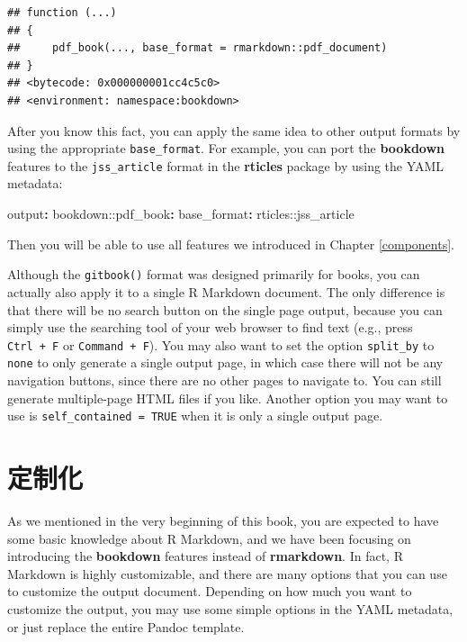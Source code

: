 \documentclass[
  12pt,
]{krantz}
\newenvironment{Shaded}{\begin{snugshade}}{\end{snugshade}}
\newcommand{\AttributeTok}[1]{\textcolor[rgb]{0.77,0.63,0.00}{#1}}
\newcommand{\FunctionTok}[1]{\textcolor[rgb]{0.00,0.00,0.00}{#1}}
\newcommand{\KeywordTok}[1]{\textcolor[rgb]{0.13,0.29,0.53}{\textbf{#1}}}
\theoremstyle{definition}
\theoremstyle{definition}
\theoremstyle{definition}
\theoremstyle{definition}
\theoremstyle{remark}
\begin{document}
\begin{verbatim}
## function (...) 
## {
##     pdf_book(..., base_format = rmarkdown::pdf_document)
## }
## <bytecode: 0x000000001cc4c5c0>
## <environment: namespace:bookdown>
\end{verbatim}

After you know this fact, you can apply the same idea to other output formats by using the appropriate \texttt{base\_format}. For example, you can port the \textbf{bookdown} features to the \texttt{jss\_article} format in the \textbf{rticles} package \citep{R-rticles} by using the YAML metadata:

\begin{Shaded}
\begin{Highlighting}[]
\FunctionTok{output}\KeywordTok{:}
\AttributeTok{  bookdown:}\FunctionTok{:pdf\_book}\KeywordTok{:}
\AttributeTok{    }\FunctionTok{base\_format}\KeywordTok{:}\AttributeTok{ rticles::jss\_article}
\end{Highlighting}
\end{Shaded}

Then you will be able to use all features we introduced in Chapter \ref{components}.

Although the \texttt{gitbook()} format was designed primarily for books, you can actually also apply it to a single R Markdown document. The only difference is that there will be no search button on the single page output, because you can simply use the searching tool of your web browser to find text (e.g., press \texttt{Ctrl\ +\ F} or \texttt{Command\ +\ F}). You may also want to set the option \texttt{split\_by} to \texttt{none} to only generate a single output page, in which case there will not be any navigation buttons, since there are no other pages to navigate to. You can still generate multiple-page HTML files if you like. Another option you may want to use is \texttt{self\_contained\ =\ TRUE} when it is only a single output page.

\hypertarget{customization}{%
\chapter{定制化}\label{customization}}

As we mentioned in the very beginning of this book, you are expected to have some basic knowledge about R Markdown, and we have been focusing on introducing the \textbf{bookdown} features instead of \textbf{rmarkdown}. In fact, R Markdown is highly customizable, and there are many options that you can use to customize the output document. Depending on how much you want to customize the output, you may use some simple options in the YAML metadata, or just replace the entire Pandoc template.
\end{document}
